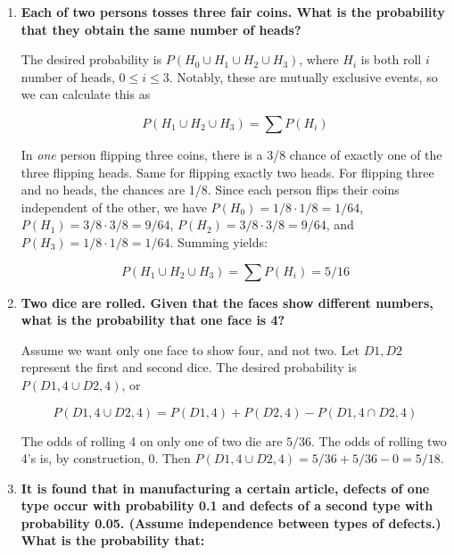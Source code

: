 \documentclass[10pt, oneside]{article}   	%
\theoremstyle{definition}
\begin{document}
\begin{enumerate}[label=3.\arabic*]
\item  \begin{tcolorbox}[
  colback=Cerulean!5!white,
  colframe=Cerulean!75!black]
\textbf{Each of two persons tosses three fair coins. What is the probability that they obtain the same number of heads?}
\end{tcolorbox}

The desired probability is $P(H_0 \cup H_1 \cup H_2 \cup H_3)$, where $H_i$ is both roll $i$ number of heads, $0 \leq i \leq 3$. Notably, these are mutually exclusive events, so we can calculate this as

\[ P(H_1 \cup H_2 \cup H_3) = \sum P(H_i) \]

In \textit{one} person flipping three coins, there is a 3/8 chance of exactly one of the three flipping heads. Same for flipping exactly two heads. For flipping three and no heads, the chances are 1/8. Since each person flips their coins independent of the other, we have $P(H_0) = 1/8 \cdot 1/8 = 1/64$, $P(H_1) = 3/8 \cdot 3/8 = 9/64$, $P(H_2) = 3/8 \cdot 3/8 = 9/64$, and $P(H_3) = 1/8 \cdot 1/8 = 1/64$. Summing yields:

\[ P(H_1 \cup H_2 \cup H_3) = \sum P(H_i) = \boxed{5/16} \]

\item  \begin{tcolorbox}[
  colback=Cerulean!5!white,
  colframe=Cerulean!75!black]
\textbf{Two dice are rolled. Given that the faces show different numbers, what is the probability that one face is 4?}
\end{tcolorbox}

Assume we want only one face to show four, and not two. Let $D1, D2$ represent the first and second dice. The desired probability is $P(D1, 4 \cup D2, 4)$, or

\[ P(D1, 4 \cup D2, 4) = P(D1, 4) + P(D2, 4) - P(D1,4 \cap D2,4) \]

The odds of rolling 4 on only one of two die are $5/36$. The odds of rolling two 4's is, by construction, $0$. Then $P(D1, 4 \cup D2, 4) = 5/36 + 5/36 - 0 = \boxed{5/18}$.

\item  \begin{tcolorbox}[
  colback=Cerulean!5!white,
  colframe=Cerulean!75!black]
\textbf{It is found that in manufacturing a certain article, defects of one type occur with probability 0.1 and defects of a second type with probability 0.05. (Assume independence between types of defects.) What is the probability that:}
\end{tcolorbox}


\end{enumerate}
\end{document}

